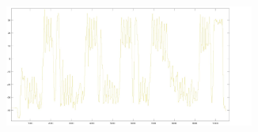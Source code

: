 \documentclass[a4paper]{article}
\begin{document}
\begin{minipage}{\linewidth}
\begin{center}
\includegraphics[width=154mm, height= 40mm]{./images/registrazione_tesi/mag_phZ.jpg} 
\end{center}
\end{minipage}
\makebox[\linewidth]{}


\clearpage

\end{document}
